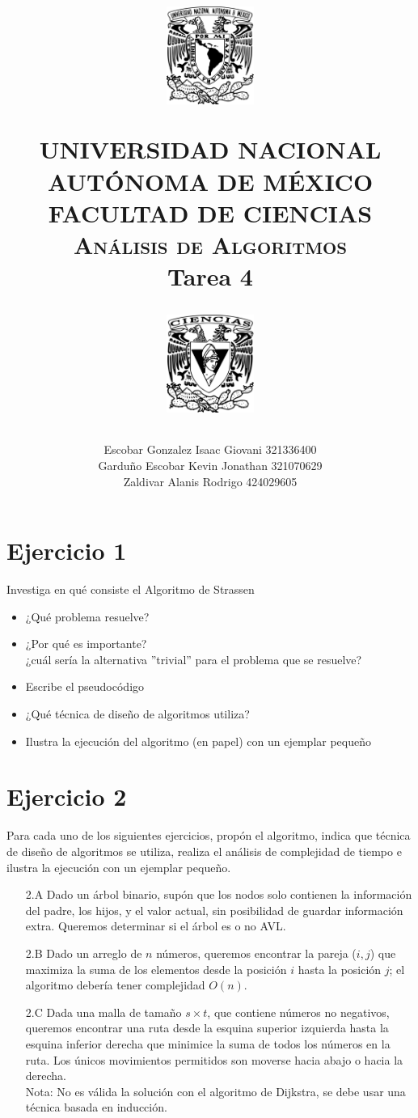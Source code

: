 \documentclass[12pt]{article}
\title{
		\vspace{-0.7in}
		\usefont{OT1}{bch}{b}{n}
		\begin{minipage}{3cm}
        \vspace{-0.5in}
    	\begin{center}
    		\includegraphics[height=3.2cm]{../logo_unam.png}
    	\end{center}
    \end{minipage}\hfill
    \begin{minipage}{10.7cm}

    	\begin{center}
\normalfont \normalsize \textsc{UNIVERSIDAD NACIONAL AUTÓNOMA DE MÉXICO \\ FACULTAD DE CIENCIAS \\ Análisis de Algoritmos } \\
		\huge Tarea 4
    	\end{center}

    \end{minipage}\hfill
    \begin{minipage}{3.2cm}
    \vspace{-0.5in}
    	\begin{center}
    		\includegraphics[height=3.2cm]{../logo_fc.png}
    	\end{center}
    \end{minipage}

\author{Escobar Gonzalez Isaac Giovani \hspace{1cm} 321336400\\
        Garduño Escobar Kevin Jonathan \hspace{0.5cm} 321070629\\
        Zaldivar Alanis Rodrigo \hspace{2.75cm} 424029605 }
\date{}
}
\begin{document}
\maketitle

\section*{Ejercicio 1}
\noindent Investiga en qué consiste el Algoritmo de Strassen
\begin{itemize}
    \item ¿Qué problema resuelve?
    \item ¿Por qué es importante?\\
    ¿cuál sería la alternativa ”trivial” para el problema que se resuelve?
    \item Escribe el pseudocódigo
    \item ¿Qué técnica de diseño de algoritmos utiliza?
    \item Ilustra la ejecución del algoritmo (en papel) con un ejemplar pequeño
\end{itemize}

\section*{Ejercicio 2}
\noindent Para cada uno de los siguientes ejercicios, propón el algoritmo, indica que técnica de diseño de algoritmos se utiliza, realiza el análisis de complejidad de tiempo e ilustra la ejecución con un ejemplar pequeño.
\begin{enumerate}
    \item[2.A] Dado un árbol binario, supón que los nodos solo contienen la información del padre, los hijos, y el valor actual, sin posibilidad de guardar información extra. Queremos determinar si el árbol es o no AVL.
    \item[2.B] Dado un arreglo de $n$ números, queremos encontrar la pareja ($i, j$) que maximiza la suma de los elementos desde la posición $i$ hasta la posición $j$; el algoritmo debería tener complejidad $O(n)$.
    \item[2.C] Dada una malla de tamaño $s \times t$, que contiene números no negativos, queremos encontrar una ruta desde la esquina superior izquierda hasta la esquina inferior derecha que minimice la suma de todos los números en la ruta. Los únicos movimientos permitidos son moverse hacia abajo o hacia la derecha.\\
    Nota: No es válida la solución con el algoritmo de Dijkstra, se debe usar una técnica basada en inducción.
\end{enumerate}
\end{document}
